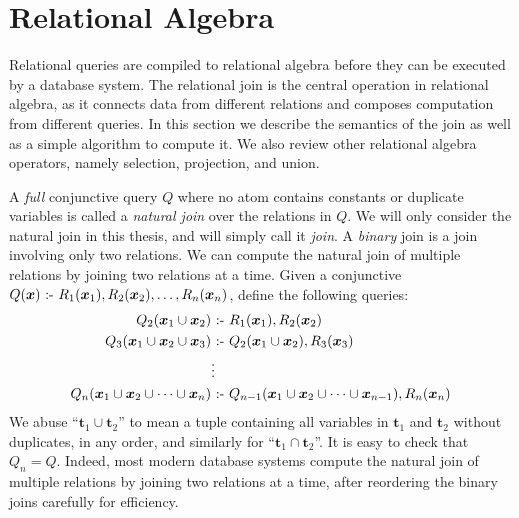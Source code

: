 \section{Relational Algebra}
\label{sec:join}

Relational queries are compiled to relational algebra 
 before they can be executed by a database system.
The relational join is the central operation in relational algebra,
 as it connects data from different relations 
 and composes computation from different queries.
In this section we describe the semantics of the join
 as well as a simple algorithm to compute it.
We also review other relational algebra operators,
 namely selection, projection, and union.

A {\em full} conjunctive query $Q$ where 
 no atom contains constants or duplicate variables
 is called a {\em natural join} over the relations in $Q$.
We will only consider the natural join in this thesis, 
 and will simply call it {\em join}.
A {\em binary} join is a join involving only two relations.
We can compute the natural join of multiple relations 
 by joining two relations at a time.
Given a conjunctive $Q(\bm{x}) \text{ :- } R_1(\bm{x}_1), R_2(\bm{x}_2), \ldots, R_n(\bm{x}_n)$,
 define the following queries:
\begin{align*}
Q_2({\bm x_1} \cup {\bm x_2}) &\text{ :- } R_1({\bm x_1}), R_2({\bm x_2})\\
Q_3({\bm x_1} \cup {\bm x_2} \cup {\bm x_3}) &\text{ :- } Q_2({\bm x_1} \cup {\bm x_2}), R_3({\bm x_3})\\
& \vdots \\
Q_n({\bm x_1} \cup {\bm x_2} \cup \cdots \cup {\bm x_n}) &\text{ :- } Q_{n-1}({\bm x_1} \cup {\bm x_2} \cup \cdots \cup {\bm x_{n-1}}), R_n({\bm x_n})
\end{align*}
We abuse ``${\bm t_1} \cup {\bm t_2}$'' to mean a tuple containing 
 all variables in ${\bm t_1}$ and ${\bm t_2}$ without duplicates, in any order, 
 and similarly for ``${\bm t_1} \cap {\bm t_2}$''.
It is easy to check that $Q_n = Q$. 
Indeed, most modern database systems compute the natural join of multiple relations 
 by joining two relations at a time, 
 after reordering the binary joins carefully for efficiency. 

